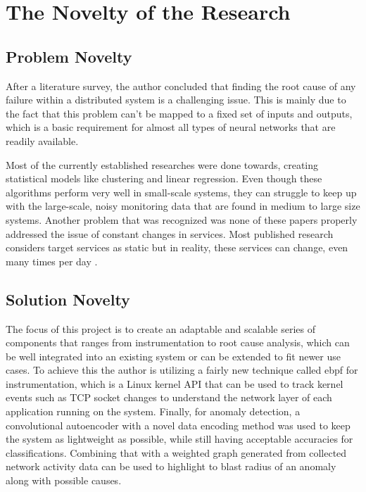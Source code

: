 \section{The Novelty of the Research}

\subsection{Problem Novelty}

After a literature survey, the author concluded that finding the root cause of any failure within a distributed system is a challenging issue. This is mainly due to the fact that this problem can't be mapped to a fixed set of inputs and outputs, which is a basic requirement for almost all types of neural networks that are readily available. 


Most of the currently established researches were done towards, creating statistical models like clustering and linear regression. Even though these algorithms perform very well in small-scale systems, they can struggle to keep up with the large-scale, noisy monitoring data that are found in medium to large size systems. Another problem that was recognized was none of these papers properly addressed the issue of constant changes in services. Most published research considers target services as static but in reality, these services can change, even many times per day \citep{GoingtoM51:online}.

\subsection{Solution Novelty}


The focus of this project is to create an adaptable and scalable series of components that ranges from instrumentation to root cause analysis, which can be well integrated into an existing system or can be extended to fit newer use cases. To achieve this the author is utilizing a fairly new technique called \ac{ebpf} for instrumentation, which is a Linux kernel API that can be used to track kernel events such as TCP socket changes to understand the network layer of each application running on the system. Finally, for anomaly detection, a convolutional autoencoder with a novel data encoding method was used to keep the system as lightweight as possible, while still having acceptable accuracies for classifications. Combining that with a weighted graph generated from collected network activity data can be used to highlight to blast radius of an anomaly along with possible causes.